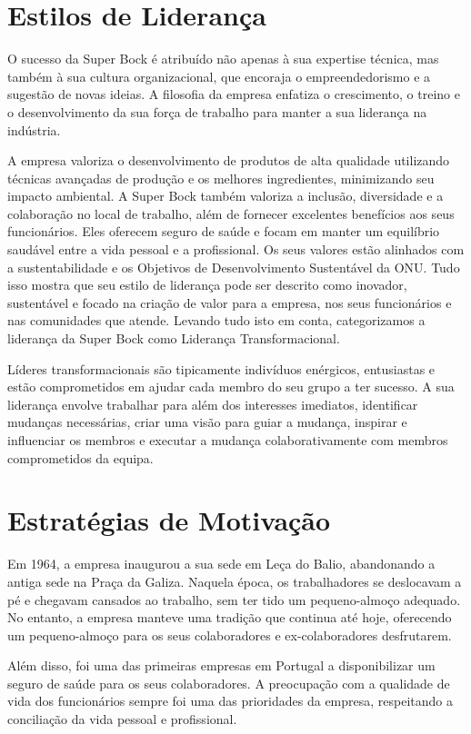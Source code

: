 \section{Estilos de Liderança}

O sucesso da Super Bock é atribuído não apenas à sua expertise técnica, mas também à sua cultura organizacional, que encoraja o empreendedorismo e a sugestão de novas ideias. A filosofia da empresa enfatiza o crescimento, o treino e o desenvolvimento da sua força de trabalho para manter a sua liderança na indústria.

A empresa valoriza o desenvolvimento de produtos de alta qualidade utilizando técnicas avançadas de produção e os melhores ingredientes, minimizando seu impacto ambiental. A Super Bock também valoriza a inclusão, diversidade e a colaboração no local de trabalho, além de fornecer excelentes benefícios aos seus funcionários. Eles oferecem seguro de saúde e focam em manter um equilíbrio saudável entre a vida pessoal e a profissional. Os seus valores estão alinhados com a sustentabilidade e os Objetivos de Desenvolvimento Sustentável da ONU. Tudo isso mostra que seu estilo de liderança pode ser descrito como inovador, sustentável e focado na criação de valor para a empresa, nos seus funcionários e nas comunidades que atende. Levando tudo isto em conta, categorizamos a liderança da Super Bock como Liderança Transformacional.

Líderes transformacionais são tipicamente indivíduos enérgicos, entusiastas e estão comprometidos em ajudar cada membro do seu grupo a ter sucesso. A sua liderança envolve trabalhar para além dos interesses imediatos, identificar mudanças necessárias, criar uma visão para guiar a mudança, inspirar e influenciar os membros e executar a mudança colaborativamente com membros comprometidos da equipa.

\section{Estratégias de Motivação}

Em 1964, a empresa inaugurou a sua sede em Leça do Balio, abandonando a antiga sede na Praça da Galiza. Naquela época, os trabalhadores se deslocavam a pé e chegavam cansados ao trabalho, sem ter tido um pequeno-almoço adequado. No entanto, a empresa manteve uma tradição que continua até hoje, oferecendo um pequeno-almoço para os seus colaboradores e ex-colaboradores desfrutarem.

Além disso, foi uma das primeiras empresas em Portugal a disponibilizar um seguro de saúde para os seus colaboradores. A preocupação com a qualidade de vida dos funcionários sempre foi uma das prioridades da empresa, respeitando a conciliação da vida pessoal e profissional.

